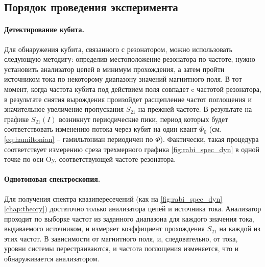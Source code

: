 \documentclass[12pt, twoside]{report}
\numberwithin{equation}{section}
\numberwithin{figure}{section}
\begin{document}
\subsection{Порядок проведения эксперимента}

\paragraph{Детектирование кубита.} Для обнаружения кубита, связанного с резонатором, можно использовать следующую методигу: определив местоположение резонатора по частоте, нужно установить анализатор цепей в минимум прохождения, а затем пройти источником тока по некоторому диапазону значений магнитного поля. В тот момент, когда частота кубита под действием поля совпадет c частотой резонатора, в результате снятия вырождения произойдет расщепление частот поглощения и значительное увеличение пропускания $S_{21}$ на прежней частоте. В результате на графике $S_{21} (I)$ возникнут периодические пики, период которых будет соответствовать изменению потока через кубит на один квант $\Phi_0$ (см. \eqref{eq:hamiltonian} -- гамильтониан периодичен по $\Phi$). Фактически, такая процедура соответствует измерению среза трехмерного графика \autoref{fig:rabi_spec_dyn} в одной точке по оси Oy, соответствующей частоте резонатора.

\paragraph{Однотоновая спектроскопия.} Для получения спектра квазипересечений (как на \autoref{fig:rabi_spec_dyn} \autoref{chap:theory}) достаточно только анализатора цепей и источника тока. Анализатор проходит по выборке частот из заданного диапазона для каждого значения тока, выдаваемого источником, и измеряет коэффициент прохождения $S_{21}$ на каждой из этих частот. В зависимости от магнитного поля, и, следовательно, от тока, уровни системы перестраиваются, и частота поглощения изменяется, что и обнаруживается анализатором.
\end{document}
